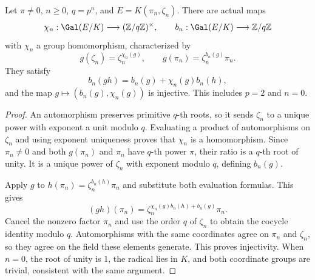 \begin{lemma}
\label{ft:finite-coordinates}
\leanok
Let $\pi\ne0$, $n\geq0$, $q=p^n$, and $E=K(\pi_n,\zeta_n)$.
There are actual maps
\[
 \chi_n:\Gal(E/K)\longrightarrow(\mathbb Z/q\mathbb Z)^\times,
 \qquad b_n:\Gal(E/K)\longrightarrow\mathbb Z/q\mathbb Z
\]
with $\chi_n$ a group homomorphism, characterized by
\[
 g(\zeta_n)=\zeta_n^{\chi_n(g)},\qquad
 g(\pi_n)=\zeta_n^{b_n(g)}\pi_n.
\]
They satisfy
\[
 b_n(gh)=b_n(g)+\chi_n(g)b_n(h),
\]
and the map $g\mapsto(b_n(g),\chi_n(g))$ is injective. This includes
$p=2$ and $n=0$.
\end{lemma}
\begin{proof}
An automorphism preserves primitive $q$-th roots, so it sends $\zeta_n$
to a unique power with exponent a unit modulo $q$. Evaluating a product
of automorphisms on $\zeta_n$ and using exponent uniqueness proves that
$\chi_n$ is a homomorphism. Since $\pi_n\ne0$ and both $g(\pi_n)$ and
$\pi_n$ have $q$-th power $\pi$, their ratio is a $q$-th root of unity.
It is a unique power of $\zeta_n$ with exponent modulo $q$, defining
$b_n(g)$.

Apply $g$ to $h(\pi_n)=\zeta_n^{b_n(h)}\pi_n$ and substitute both
evaluation formulas. This gives
\[
 (gh)(\pi_n)=\zeta_n^{\chi_n(g)b_n(h)+b_n(g)}\pi_n.
\]
Cancel the nonzero factor $\pi_n$ and use the order $q$ of $\zeta_n$
to obtain the cocycle identity modulo $q$. Automorphisms with the same
coordinates agree on $\pi_n$ and $\zeta_n$, so they agree on the field
these elements generate. This proves injectivity. When $n=0$, the root
of unity is $1$, the radical lies in $K$, and both coordinate groups are
trivial, consistent with the same argument.
\end{proof}

